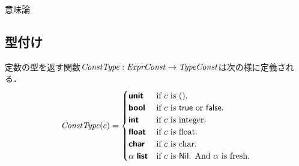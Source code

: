 \documentclass[a4paper,titlepage,report,disablejfam]{jsbook}
\begin{document}
\begin{resbonsiblesection}{意味論}{\sakamoto}
\subsection{型付け}\label{sc:typing}
定数の型を返す関数$\mathit{ConstType}:\mathit{ExprConst}\rightarrow\mathit{TypeConst}$は次の様に定義される．
\begin{equation}\label{eq:func-const-type} 
    \mathit{ConstType}(c) = \begin{cases}
        \text{\sffamily\bfseries unit} & \text{if $c$ is $\mathop{\mathsf{()}}$.} \\
        \text{\sffamily\bfseries bool} & \text{if $c$ is $\mathop{\mathsf{true}}$ or $\mathop{\mathsf{false}}$.} \\
        \text{\sffamily\bfseries int} & \text{if $c$ is integer.} \\
        \text{\sffamily\bfseries float} & \text{if $c$ is float.} \\
        \text{\sffamily\bfseries char} & \text{if $c$ is char.} \\
        \alpha\ \text{\sffamily\bfseries list} & \text{if $c$ is $\mathop{\mathsf{Nil}}$. And $\alpha$ is fresh.}
        \end{cases}
\end{equation}


\end{resbonsiblesection}
\end{document}

